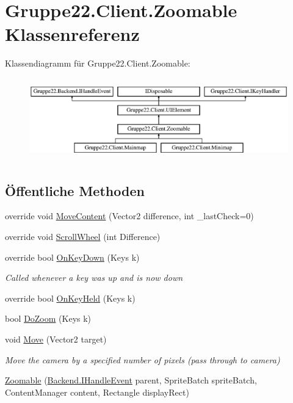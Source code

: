 \hypertarget{class_gruppe22_1_1_client_1_1_zoomable}{\section{Gruppe22.\-Client.\-Zoomable Klassenreferenz}
\label{class_gruppe22_1_1_client_1_1_zoomable}
}
Klassendiagramm für Gruppe22.\-Client.\-Zoomable\-:\begin{figure}[H]
\begin{center}
\leavevmode
\includegraphics[height=3.589744cm]{class_gruppe22_1_1_client_1_1_zoomable}
\end{center}
\end{figure}
\subsection*{Öffentliche Methoden}
\begin{DoxyCompactItemize}
\item 
override void \hyperlink{class_gruppe22_1_1_client_1_1_zoomable_a809400f1259e419df7b95ba1577effc0}{Move\-Content} (Vector2 difference, int \-\_\-last\-Check=0)
\item 
override void \hyperlink{class_gruppe22_1_1_client_1_1_zoomable_a779978683bab4488bd4ff7cdb233ff20}{Scroll\-Wheel} (int Difference)
\item 
override bool \hyperlink{class_gruppe22_1_1_client_1_1_zoomable_a123f31a025a85e07001dab61a8102881}{On\-Key\-Down} (Keys k)
\begin{DoxyCompactList}\small\item\em Called whenever a key was up and is now down \end{DoxyCompactList}\item 
override bool \hyperlink{class_gruppe22_1_1_client_1_1_zoomable_ac2965c52d19ec510714c511583ec4b36}{On\-Key\-Held} (Keys k)
\item 
bool \hyperlink{class_gruppe22_1_1_client_1_1_zoomable_af55927c548e3553ab22b6145bb9d6f25}{Do\-Zoom} (Keys k)
\item 
void \hyperlink{class_gruppe22_1_1_client_1_1_zoomable_ac99cb8dcfdbe80e1d83a873df79f1584}{Move} (Vector2 target)
\begin{DoxyCompactList}\small\item\em Move the camera by a specified number of pixels (pass through to camera) \end{DoxyCompactList}\item 
\hyperlink{class_gruppe22_1_1_client_1_1_zoomable_a0d95fe7b3fd5e241d055392b1afc8cf5}{Zoomable} (\hyperlink{interface_gruppe22_1_1_backend_1_1_i_handle_event}{Backend.\-I\-Handle\-Event} parent, Sprite\-Batch sprite\-Batch, Content\-Manager content, Rectangle display\-Rect)
\end{DoxyCompactItemize}
